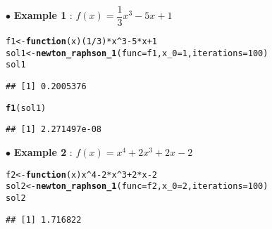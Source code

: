 \documentclass[11pt, a4paper]{article}\usepackage[]{graphicx}\usepackage[]{xcolor}
\makeatletter
\newcommand{\hlnum}[1]{\textcolor[rgb]{0.686,0.059,0.569}{#1}}%
\newcommand{\hlopt}[1]{\textcolor[rgb]{0,0,0}{#1}}%
\newcommand{\hldef}[1]{\textcolor[rgb]{0.345,0.345,0.345}{#1}}%
\newcommand{\hlkwa}[1]{\textcolor[rgb]{0.161,0.373,0.58}{\textbf{#1}}}%
\newcommand{\hlkwb}[1]{\textcolor[rgb]{0.69,0.353,0.396}{#1}}%
\newcommand{\hlkwc}[1]{\textcolor[rgb]{0.333,0.667,0.333}{#1}}%
\newcommand{\hlkwd}[1]{\textcolor[rgb]{0.737,0.353,0.396}{\textbf{#1}}}%
\newenvironment{kframe}{%
 \def\at@end@of@kframe{}%
 \ifinner\ifhmode%
  \def\at@end@of@kframe{\end{minipage}}%
  \begin{minipage}{\columnwidth}%
 \fi\fi%
 \def\FrameCommand##1{\hskip\@totalleftmargin \hskip-\fboxsep
 \colorbox{shadecolor}{##1}\hskip-\fboxsep
     \hskip-\linewidth \hskip-\@totalleftmargin \hskip\columnwidth}%
 \MakeFramed {\advance\hsize-\width
   \@totalleftmargin\z@ \linewidth\hsize
   \@setminipage}}%
 {\par\unskip\endMakeFramed%
 \at@end@of@kframe}
\newenvironment{knitrout}{}{} %
\makeatother
\begin{document}
\newpage

$\bullet$ \textbf{Example 1} : $f(x) = \dfrac{1}{3} x^3 - 5x + 1$

\begin{knitrout}
\color{fgcolor}\begin{kframe}
\begin{alltt}
\hldef{f1} \hlkwb{<-} \hlkwa{function}\hldef{(}\hlkwc{x}\hldef{) (}\hlnum{1}\hlopt{/}\hlnum{3}\hldef{)} \hlopt{*} \hldef{x}\hlopt{^}\hlnum{3} \hlopt{-} \hlnum{5}\hlopt{*}\hldef{x} \hlopt{+} \hlnum{1}
\hldef{sol1} \hlkwb{<-} \hlkwd{newton_raphson_1}\hldef{(}\hlkwc{func} \hldef{= f1,} \hlkwc{x_0} \hldef{=} \hlnum{1}\hldef{,} \hlkwc{iterations} \hldef{=} \hlnum{100}\hldef{)}
\hldef{sol1}
\end{alltt}
\begin{verbatim}
## [1] 0.2005376
\end{verbatim}
\end{kframe}
\end{knitrout}

\begin{knitrout}
\color{fgcolor}\begin{kframe}
\begin{alltt}
\hlkwd{f1}\hldef{(sol1)}
\end{alltt}
\begin{verbatim}
## [1] 2.271497e-08
\end{verbatim}
\end{kframe}
\end{knitrout}

$\bullet$ \textbf{Example 2} : $f(x) = x^4 + 2x^3 + 2x - 2$

\begin{knitrout}
\color{fgcolor}\begin{kframe}
\begin{alltt}
\hldef{f2} \hlkwb{<-} \hlkwa{function}\hldef{(}\hlkwc{x}\hldef{) x}\hlopt{^}\hlnum{4} \hlopt{-} \hlnum{2} \hlopt{*} \hldef{x}\hlopt{^}\hlnum{3} \hlopt{+} \hlnum{2}\hlopt{*}\hldef{x} \hlopt{-} \hlnum{2}
\hldef{sol2} \hlkwb{<-} \hlkwd{newton_raphson_1}\hldef{(}\hlkwc{func} \hldef{= f2,} \hlkwc{x_0} \hldef{=} \hlnum{2}\hldef{,} \hlkwc{iterations} \hldef{=} \hlnum{100}\hldef{)}
\hldef{sol2}
\end{alltt}
\begin{verbatim}
## [1] 1.716822
\end{verbatim}
\end{kframe}
\end{knitrout}
\end{document}
